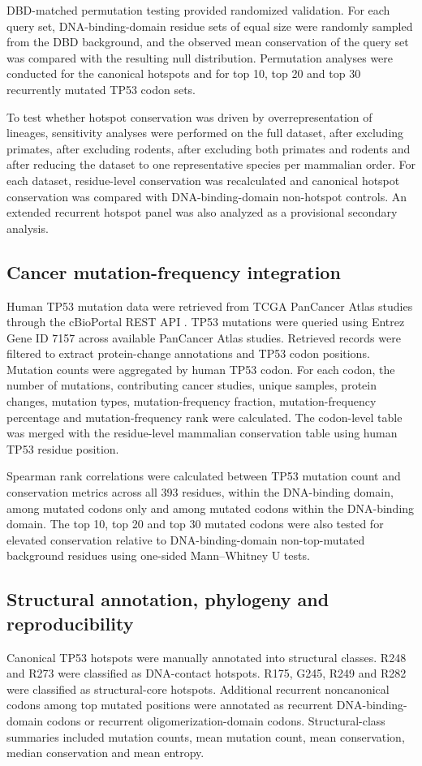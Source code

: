 \documentclass[namedate,webpdf,contemporary,large]{oup-authoring-template}
\begin{document}
DBD-matched permutation testing provided randomized validation. For each query set, DNA-binding-domain residue sets of equal size were randomly sampled from the DBD background, and the observed mean conservation of the query set was compared with the resulting null distribution. Permutation analyses were conducted for the canonical hotspots and for top 10, top 20 and top 30 recurrently mutated TP53 codon sets.

To test whether hotspot conservation was driven by overrepresentation of lineages, sensitivity analyses were performed on the full dataset, after excluding primates, after excluding rodents, after excluding both primates and rodents and after reducing the dataset to one representative species per mammalian order. For each dataset, residue-level conservation was recalculated and canonical hotspot conservation was compared with DNA-binding-domain non-hotspot controls. An extended recurrent hotspot panel was also analyzed as a provisional secondary analysis.

\subsection{Cancer mutation-frequency integration}
Human TP53 mutation data were retrieved from TCGA PanCancer Atlas studies through the cBioPortal REST API \citep{cerami2012,gao2013,liu2018}. TP53 mutations were queried using Entrez Gene ID 7157 across available PanCancer Atlas studies. Retrieved records were filtered to extract protein-change annotations and TP53 codon positions. Mutation counts were aggregated by human TP53 codon. For each codon, the number of mutations, contributing cancer studies, unique samples, protein changes, mutation types, mutation-frequency fraction, mutation-frequency percentage and mutation-frequency rank were calculated. The codon-level table was merged with the residue-level mammalian conservation table using human TP53 residue position.

Spearman rank correlations were calculated between TP53 mutation count and conservation metrics across all 393 residues, within the DNA-binding domain, among mutated codons only and among mutated codons within the DNA-binding domain. The top 10, top 20 and top 30 mutated codons were also tested for elevated conservation relative to DNA-binding-domain non-top-mutated background residues using one-sided Mann--Whitney U tests.

\subsection{Structural annotation, phylogeny and reproducibility}
Canonical TP53 hotspots were manually annotated into structural classes. R248 and R273 were classified as DNA-contact hotspots. R175, G245, R249 and R282 were classified as structural-core hotspots. Additional recurrent noncanonical codons among top mutated positions were annotated as recurrent DNA-binding-domain codons or recurrent oligomerization-domain codons. Structural-class summaries included mutation counts, mean mutation count, mean conservation, median conservation and mean entropy.
\end{document}
